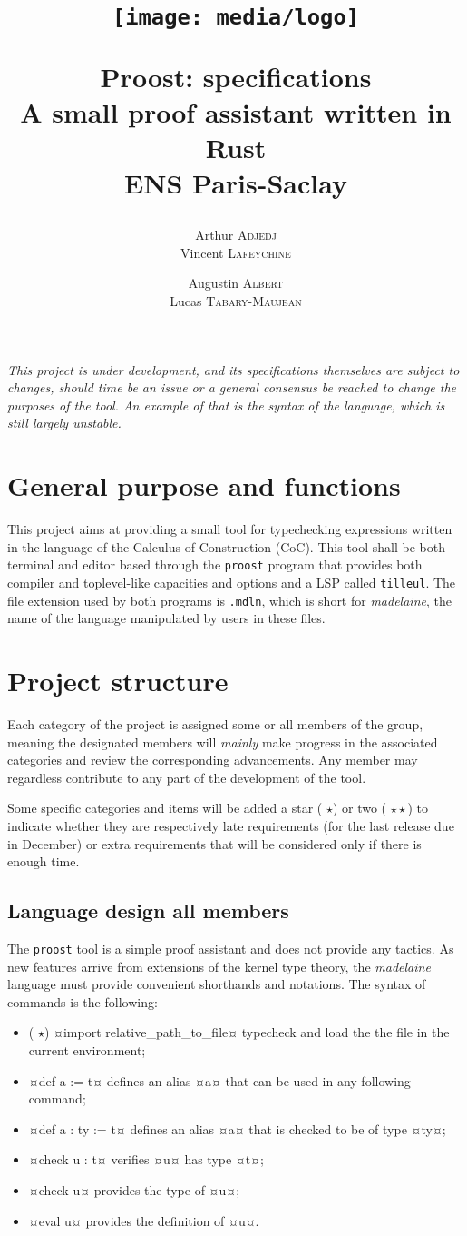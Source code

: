 \documentclass[twocolumn]{article}
\author{
  Arthur \textsc{Adjedj}\\
  Vincent \textsc{Lafeychine} \and
  Augustin \textsc{Albert} \\
  Lucas \textsc{Tabary-Maujean}
}
\title{
  \texttt{[image: media/logo]}

  \textbf{Proost: specifications}\\
  \large A small proof assistant written in Rust
  \\[1\baselineskip]\normalsize ENS Paris-Saclay
}
\newcommand{\members}[1]{\texorpdfstring{\hfill\scriptsize #1}{}}
\newcommand{\etun}{({\color{Green} $\star$}) }
\newcommand{\etde}{({\color{Orange} $\star\star$}) }
\begin{document}
\thispagestyle{fancy}
\maketitle

\emph{
  This project is under development, and its specifications themselves are
  subject to changes, should time be an issue or a general consensus be reached
  to change the purposes of the tool. An example of that is the syntax of the
  language, which is still largely unstable. }

\section{General purpose and functions} This project aims at providing a small
tool for typechecking expressions written in the language of the Calculus of
Construction (CoC). This tool shall be both terminal and editor based through
the \texttt{proost} program that provides both compiler and toplevel-like
capacities and options and a LSP called \texttt{tilleul}. The file extension
used by both programs is \texttt{.mdln}, which is short for \emph{madelaine},
the name of the language manipulated by users in these files.


\section{Project structure} Each category of the project is assigned some or all
members of the group, meaning the designated members will \emph{mainly} make
progress in the associated categories and review the corresponding advancements.
Any member may regardless contribute to any part of the development of the tool.

Some specific categories and items will be added a star \etun or two \etde to
indicate whether they are respectively late requirements (for the last release
due in December) or extra requirements that will be considered only if there is
enough time.

\subsection{Language design \members{all members}} The \texttt{proost} tool is a
simple proof assistant and does not provide any tactics. As new features arrive
from extensions of the kernel type theory, the \emph{madelaine} language must
provide convenient shorthands and notations. The syntax of commands is the
following: \begin{itemize} \item \etun¤import relative_path_to_file¤ typecheck
	and load the the file in the current environment; \item ¤def a := t¤
	defines an alias ¤a¤ that can be used in any following command; \item
	¤def a : ty := t¤ defines an alias ¤a¤ that is checked to be of type
	¤ty¤; \item ¤check u : t¤ verifies ¤u¤ has type ¤t¤;
  \item ¤check u¤ provides the type of ¤u¤;
  \item ¤eval u¤ provides the definition of ¤u¤.
\end{itemize}
\end{document}
